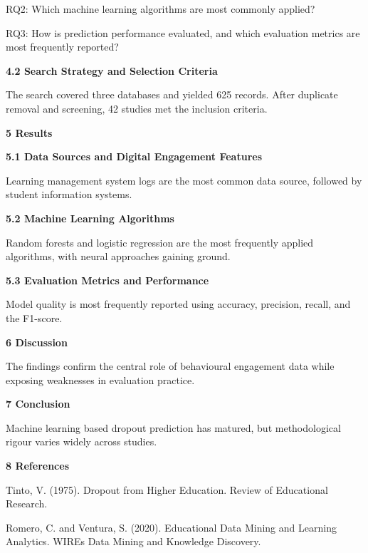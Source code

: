 \documentclass[12pt]{article}
\begin{document}
RQ2: Which machine learning algorithms are most commonly applied?

RQ3: How is prediction performance evaluated, and which evaluation metrics are most frequently reported?

\textbf{4.2 Search Strategy and Selection Criteria}

The search covered three databases and yielded 625 records. After duplicate removal and screening, 42 studies met the inclusion criteria.

\textbf{5 Results}

\textbf{5.1 Data Sources and Digital Engagement Features}

Learning management system logs are the most common data source, followed by student information systems.

\textbf{5.2 Machine Learning Algorithms}

Random forests and logistic regression are the most frequently applied algorithms, with neural approaches gaining ground.

\textbf{5.3 Evaluation Metrics and Performance}

Model quality is most frequently reported using accuracy, precision, recall, and the F1-score.

\textbf{6 Discussion}

The findings confirm the central role of behavioural engagement data while exposing weaknesses in evaluation practice.

\textbf{7 Conclusion}

Machine learning based dropout prediction has matured, but methodological rigour varies widely across studies.

\textbf{8 References}

Tinto, V. (1975). Dropout from Higher Education. Review of Educational Research.

Romero, C. and Ventura, S. (2020). Educational Data Mining and Learning Analytics. WIREs Data Mining and Knowledge Discovery.
\end{document}
